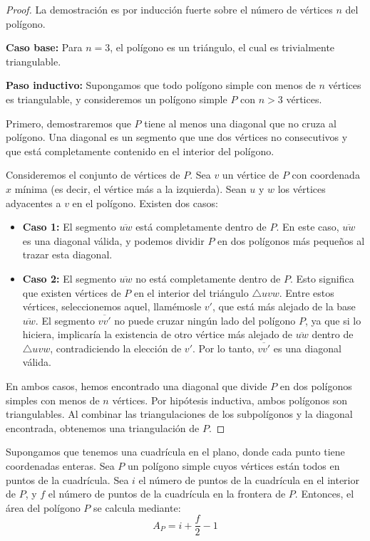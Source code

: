 \documentclass[a4paper,12pt]{article}
\begin{document}
\begin{proof}
    La demostración es por inducción fuerte sobre el número de vértices $n$ del polígono.

    \textbf{Caso base:} Para $n=3$, el polígono es un triángulo, el cual es trivialmente triangulable.

    \textbf{Paso inductivo:} Supongamos que todo polígono simple con menos de $n$ vértices es triangulable, y consideremos un polígono simple $P$ con $n > 3$ vértices.

    Primero, demostraremos que $P$ tiene al menos una diagonal que no cruza al polígono. Una diagonal es un segmento que une dos vértices no consecutivos y que está completamente contenido en el interior del polígono.

    Consideremos el conjunto de vértices de $P$. Sea $v$ un vértice de $P$ con coordenada $x$ mínima (es decir, el vértice más a la izquierda). Sean $u$ y $w$ los vértices adyacentes a $v$ en el polígono. Existen dos casos:

    \begin{itemize}
        \item \textbf{Caso 1:} El segmento $\overline{uw}$ está completamente dentro de $P$. En este caso, $\overline{uw}$ es una diagonal válida, y podemos dividir $P$ en dos polígonos más pequeños al trazar esta diagonal.
        \item \textbf{Caso 2:} El segmento $\overline{uw}$ no está completamente dentro de $P$. Esto significa que existen vértices de $P$ en el interior del triángulo $\triangle uvw$. Entre estos vértices, seleccionemos aquel, llamémosle $v'$, que está más alejado de la base $\overline{uw}$. El segmento $\overline{vv'}$ no puede cruzar ningún lado del polígono $P$, ya que si lo hiciera, implicaría la existencia de otro vértice más alejado de $\overline{uw}$ dentro de $\triangle uvw$, contradiciendo la elección de $v'$. Por lo tanto, $\overline{vv'}$ es una diagonal válida.
    \end{itemize}

    En ambos casos, hemos encontrado una diagonal que divide $P$ en dos polígonos simples con menos de $n$ vértices. Por hipótesis inductiva, ambos polígonos son triangulables. Al combinar las triangulaciones de los subpolígonos y la diagonal encontrada, obtenemos una triangulación de $P$.
\end{proof}

\begin{theorem}
    Supongamos que tenemos una cuadrícula en el plano, donde cada punto tiene coordenadas enteras. Sea $P$ un polígono simple cuyos vértices están todos en puntos de la cuadrícula. Sea $i$ el número de puntos de la cuadrícula en el interior de $P$, y $f$ el número de puntos de la cuadrícula en la frontera de $P$. Entonces, el área del polígono $P$ se calcula mediante:
    $$A_P = i + \frac{f}{2} - 1$$
\end{theorem}
\end{document}

